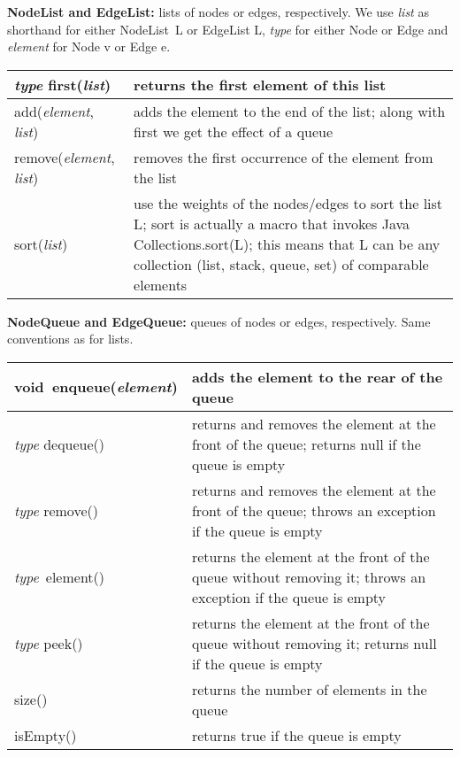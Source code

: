 \begin{table}
  \small
  \textbf{NodeList and EdgeList:} lists of nodes or edges, respectively.
  We use \emph{list} as shorthand for either \textsf{NodeList~L} or
  \textsf{EdgeList L}, \emph{type} for either \textsf{Node} or \textsf{Edge}
  and \emph{element} for \textsf{Node v} or \textsf{Edge e}.
  
  \medskip
  \begin{tabular}{| m{} | m{} |}
    \hline
    \textsf{\emph{type} first(\emph{list})}
    &
    returns the first element of this list
    \\ \hline
    \textsf{add(\emph{element}, \emph{list})}
    &
    adds the element
    to the end of the list; along with \textsf{first}
    we get the effect of a queue
    \\ \hline
    \textsf{remove(\emph{element}, \emph{list})}
    &
    removes the first occurrence of the element from the list
    \\ \hline
    \textsf{sort(\emph{list})}
    &
    use the weights of the nodes/edges to sort the list \textsf{L};
    sort is actually a macro that invokes Java \textsf{Collections.sort(L)};
    this means that \textsf{L} can be any collection (list, stack, queue, set)
    of comparable elements
    \\ \hline
  \end{tabular}  
  
  \bigskip
  \textbf{NodeQueue and EdgeQueue:} queues of nodes or edges, respectively.
  Same conventions as for lists.

  \medskip
  \begin{tabular}{| m{} | m{} |}
    \hline
      \textsf{void~enqueue(\emph{element})}
    &
    adds the element to the rear of the queue
    \\ \hline
    \textsf{\emph{type} dequeue()}
    &
    returns and removes the element at the front of the queue;
    returns \textsf{null} if the queue is empty
    \\ \hline
    \textsf{\emph{type} remove()}
    &
    returns and removes the element at the front of the queue;
    throws an exception if the queue is empty
    \\ \hline
    \textsf{\emph{type}~element()}
    &
    returns the element at the front of the queue
    without removing it;
    throws an exception if the queue is empty
    \\ \hline
    \textsf{\emph{type} peek()}
    &
    returns the element at the front of the queue
    without removing it;
    returns \textsf{null} if the queue is empty
    \\ \hline
    \textsf{size()}
    &
    returns the number of elements in the queue
    \\ \hline
    \textsf{isEmpty()}
    &
    returns \textsf{true} if the queue is empty 
    \\ \hline
  \end{tabular}


\end{table}

